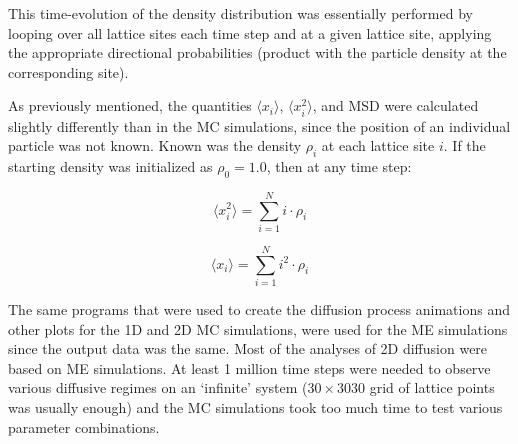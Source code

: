 	This time-evolution of the density distribution was essentially performed by looping over all lattice sites each time step and at a given lattice site, applying the appropriate directional probabilities (product with the particle density at the corresponding site). 
	
	
	As previously mentioned, the quantities $ \langle x_{i} \rangle $, $ \langle x_{i}^2 \rangle $, and MSD were calculated slightly differently than in the MC simulations, since the position of an individual particle was not known. Known was the density $ \rho_i $ at each lattice site  $ i $. If the starting density was initialized as $ \rho_0 = 1.0 $, then at any time step:
	
	\begin{equation}
		\langle x_{i}^2 \rangle = \sum_{i=1}^{N} i \cdot \rho_i 
	\end{equation}
	
	\begin{equation}
		\langle x_{i} \rangle = \sum_{i=1}^{N} i^2\cdot \rho_i
	\end{equation}
	
	The same programs that were used to create the diffusion process animations and other plots for the 1D and 2D MC simulations, were used for the ME simulations since the output data was the same. Most of the analyses of 2D diffusion were based on ME simulations. At least 1 million time steps were needed to observe various diffusive regimes on an `infinite' system ($ 30 \times 3030$ grid of lattice points was usually enough) and the MC simulations took too much time to test various parameter combinations.
	
	
